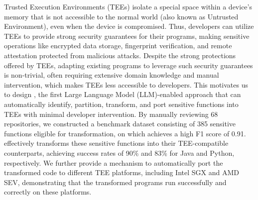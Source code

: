 Trusted Execution Environments (TEEs) isolate a special space within a device's memory that is not accessible to the normal world (also known as Untrusted Environment), even when the device is compromised. 
Thus, developers can utilize TEEs to provide strong security guarantees for their programs, making sensitive operations like encrypted data storage, fingerprint verification, and remote attestation protected from malicious attacks. 
Despite the strong protections offered by TEEs, adapting existing programs to leverage such security guarantees is non-trivial, often requiring extensive domain knowledge and manual intervention, which makes TEEs less accessible to developers. 
This motivates us to design \system, the first Large Language Model (LLM)-enabled approach that can automatically identify, partition, transform, and port sensitive functions into TEEs with minimal developer intervention. 
By manually reviewing 68 repositories, we constructed a benchmark dataset consisting of 385 sensitive functions eligible for transformation, on which \system achieves a high F1 score of 0.91. 
\system effectively transforms these sensitive functions into their TEE-compatible counterparts, achieving success rates of 90\% and 83\% for Java and Python, respectively. 
We further provide a mechanism to automatically port the transformed code to different TEE platforms, including Intel SGX and AMD SEV, demonstrating that the transformed programs run successfully and correctly on these platforms.
